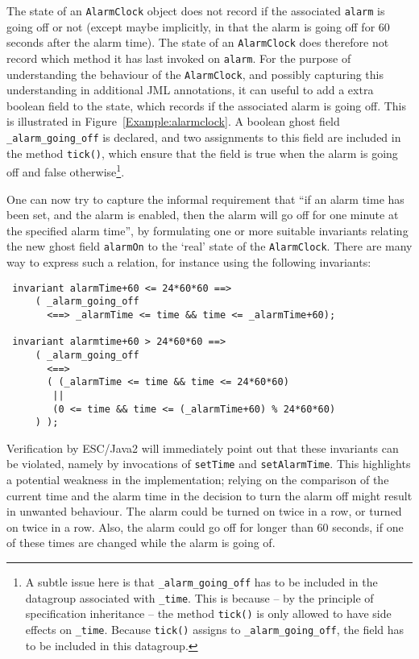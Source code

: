 \documentclass{llncs}
\begin{document}
The state of an \texttt{AlarmClock} object does not record if the associated
\texttt{alarm} is going off or not (except maybe implicitly, in that the alarm is 
going off for 60 seconds after the alarm time). The state of an \texttt{AlarmClock}
does therefore not record which method it has last invoked on \texttt{alarm}.
For the purpose of understanding the behaviour of the \texttt{AlarmClock}, 
and possibly capturing this understanding in additional JML annotations,
it can useful to add a extra boolean field to the state, which records if 
the associated alarm is going off.
This is illustrated in Figure~\ref{Example:alarmclock}.
A boolean ghost field \texttt{\_alarm\_going\_off} is declared, 
and two assignments to this field are included in the method \texttt{tick()},
which ensure that the field is true when the alarm is going off and false
otherwise\footnote{A subtle issue here is that \texttt{\_alarm\_going\_off} 
has to be included in the datagroup associated with \texttt{\_time}. This is 
because --  by the principle of specification inheritance -- the method 
\texttt{tick()} is only allowed to have side effects on \texttt{\_time}.
Because \texttt{tick()} assigns to \texttt{\_alarm\_going\_off}, the field
has to be included in this datagroup.}.

% 

One can now try to capture the informal requirement that ``if an alarm time
has been set, and the alarm is enabled, then the alarm will go off for
one minute at the specified alarm time'', by formulating one or more
suitable invariants relating the new ghost field \texttt{alarmOn} to
the `real' state of the \texttt{AlarmClock}. There are many way to express
such a relation, for instance using the following invariants:
\begin{verbatim}
 invariant alarmTime+60 <= 24*60*60 ==> 
     ( _alarm_going_off 
       <==> _alarmTime <= time && time <= _alarmTime+60);

 invariant alarmtime+60 > 24*60*60 ==> 
     ( _alarm_going_off 
       <==> 
       ( (_alarmTime <= time && time <= 24*60*60)
        ||
        (0 <= time && time <= (_alarmTime+60) % 24*60*60) 
     ) );
\end{verbatim}
Verification by ESC/Java2 will immediately point out that these invariants
can be violated,
namely by invocations of \texttt{setTime} and  \texttt{setAlarmTime}.
This highlights a potential weakness in the implementation;
relying on the comparison of the current time and the alarm time
in the decision to turn the alarm off might result in unwanted behaviour. 
The alarm could be turned on twice in a row, or turned on twice in a row.
Also, the alarm could go off for longer than 60 seconds, if one of these times 
are changed while the alarm is going of.  
\end{document}
